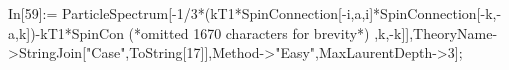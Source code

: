 In[59]:= ParticleSpectrum[-1/3*(kT1*SpinConnection[-i,a,i]*SpinConnection[-k,-a,k])-kT1*SpinCon (*omitted 1670 characters for brevity*) ,k,-k]],TheoryName->StringJoin["Case",ToString[17]],Method->"Easy",MaxLaurentDepth->3];